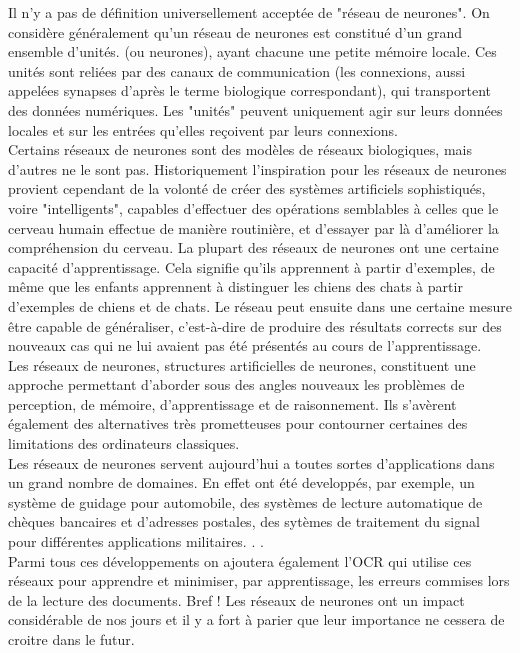 \documentclass{article}
\begin{document}
Il n’y a pas de définition universellement acceptée de "réseau de neurones". On considère généralement qu’un réseau de neurones est constitué d’un grand ensemble d’unités. (ou neurones), ayant chacune une petite mémoire locale. Ces unités sont reliées par des canaux de communication (les connexions, aussi appelées synapses d’après le terme biologique correspondant), qui transportent des données numériques. Les "unités" peuvent uniquement agir sur leurs données locales et sur les entrées qu’elles reçoivent par leurs connexions.\\

Certains réseaux de neurones sont des modèles de réseaux biologiques, mais d’autres ne le sont pas. Historiquement l’inspiration pour les réseaux de neurones provient cependant de la volonté de créer des systèmes artificiels sophistiqués, voire "intelligents", capables d’effectuer des opérations semblables à celles que le cerveau humain effectue de manière routinière, et d’essayer par là d’améliorer la compréhension du cerveau. La plupart des réseaux de neurones ont une certaine capacité d’apprentissage. Cela signifie qu’ils apprennent à partir d’exemples, de même que les enfants apprennent à distinguer les chiens des chats à partir d’exemples de chiens et de chats. Le réseau peut ensuite dans une certaine mesure être capable de généraliser, c’est-à-dire de produire des résultats corrects sur des nouveaux cas qui ne lui avaient pas été présentés au cours de l’apprentissage.\\

Les réseaux de neurones, structures artificielles de neurones, constituent une approche permettant d’aborder sous des angles nouveaux les problèmes de perception, de mémoire,
d’apprentissage et de raisonnement. Ils s’avèrent également des alternatives très prometteuses pour contourner certaines des limitations des ordinateurs classiques.\\

Les réseaux de neurones servent aujourd’hui a toutes sortes d’applications dans un grand nombre de domaines. En effet ont été developpés, par exemple, un système de guidage pour automobile, des systèmes de lecture automatique de chèques bancaires et d’adresses postales, des sytèmes de traitement du signal pour différentes applications militaires. . .\\

Parmi tous ces développements on ajoutera également l’OCR qui utilise ces réseaux pour apprendre et minimiser, par apprentissage, les erreurs commises lors de la lecture des documents. Bref ! Les réseaux de neurones ont un impact considérable de nos jours et il y a fort à parier que leur importance ne cessera de croitre dans le futur.\\
\end{document}
